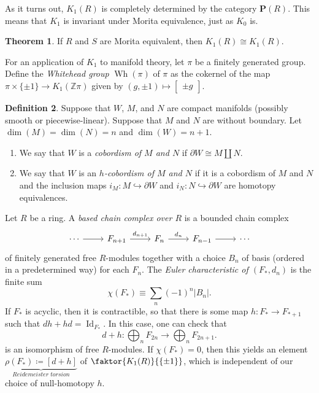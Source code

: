 \documentclass[10pt,letterpaper,cm]{nupset}
\theoremstyle{definition}
\newtheorem{definition}{Definition}[section]
\theoremstyle{theorem}
\newtheorem{theorem}[definition]{Theorem}
\theoremstyle{remark}
\renewcommand{\P}{\mathbf P}
\newcommand{\Z}{\mathbb Z}
\newcommand{\1}{\mathbf{1}}
\newcommand{\0}{\vec 0}
\DeclareMathOperator{\id}{Id}
\DeclareMathOperator{\wh}{Wh}
\begin{document}
\medskip

As it turns out, $K_1(R)$ is completely determined by the category $\P(R)$. This means that $K_1$ is invariant under Morita equivalence, just as $K_0$ is.

\begin{theorem}
 If $R$ and $S$ are Morita equivalent, then $K_1(R) \cong K_1(R)$. 
\end{theorem}

\medskip


For an application of $K_1$ to manifold theory, let $\pi$ be a finitely generated group. Define the \textit{Whitehead group} $\wh(\pi)$ of $\pi$ as the cokernel of the map $\pi \times \{\pm 1\}\to K_1(\Z\pi)$ given by $\left(g, \pm 1\right)\mapsto \begin{bmatrix} \pm g\end{bmatrix}$.

\begin{definition} Suppose that $W$, $M$, and $N$ are compact manifolds (possibly smooth or piecewise-linear). Suppose that $M$ and $N$ are without boundary. Let $\dim(M)=\dim(N) =n$ and $\dim(W) =n+1$.
\begin{enumerate}
\item We say that $W$ is a \textit{cobordism of $M$ and $N$} if $\partial{W}\cong M \coprod N$.
\item We say that $W$ is an \textit{$h$-cobordism of $M$ and $N$} if it is a cobordism of $M$ and $N$ and the inclusion maps $i_M : M \hookrightarrow \partial{W}$ and $i_N: N\hookrightarrow \partial{W}$ are homotopy equivalences.
\end{enumerate}
\end{definition}

Let $R$ be a ring. A \textit{based chain complex over $R$} is a bounded chain complex
\[
\begin{tikzcd}
\cdots \arrow[r] & F_{n+1} \arrow[r, "d_{n+1}"] & F_n \arrow[r, "d_n"] & F_{n-1} \arrow[r] & \cdots
\end{tikzcd}
\] of finitely generated free $R$-modules together with a choice $B_n$ of basis (ordered in a predetermined way) for each $F_n$. The \textit{Euler characteristic of $\left(F_{\ast}, d_n\right)$} is the finite sum
\[
\chi(F_{\ast}) \equiv \sum_{n}({-1})^n\left\lvert{B_n}\right\rvert.
\] If $F_{\ast}$ is acyclic, then it is contractible, so that there is some map $h:F_{\ast} \to F_{\ast +1}$ such that $dh+hd =\id_{F_{\ast}}$. In this case, one can check that
\[
d+h : \bigoplus_nF_{2n} \to \bigoplus_nF_{2n+1}.
\] is an isomorphism of free $R$-modules. If $\chi(F_{\ast}) =0$, then this yields an element $\underbrace{\rho(F_{\ast}) \coloneqq \left[d+h\right]}_{\textit{Reidemeister torsion}}$ of $\faktor{K_1(R)}{\left\{\pm 1\right\}}$, which is independent of our choice of null-homotopy $h$. 
\end{document}
